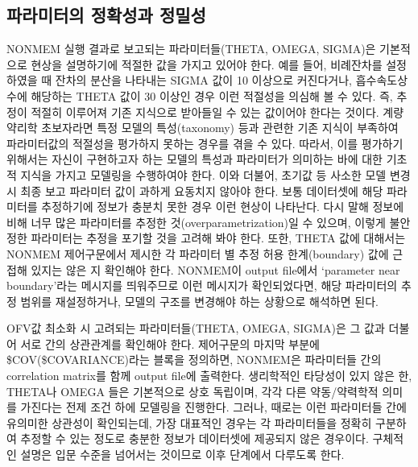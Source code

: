 \documentclass[
  11pt,
  krantz2, a4paper, twoside]{krantz}
\theoremstyle{definition}
\theoremstyle{definition}
\theoremstyle{definition}
\theoremstyle{remark}
\begin{document}
\hypertarget{uxd30cuxb77cuxbbf8uxd130uxc758-uxc815uxd655uxc131uxacfc-uxc815uxbc00uxc131}{%
\subsection{파라미터의 정확성과 정밀성}\label{uxd30cuxb77cuxbbf8uxd130uxc758-uxc815uxd655uxc131uxacfc-uxc815uxbc00uxc131}}

NONMEM 실행 결과로 보고되는 파라미터들(THETA, OMEGA, SIGMA)은 기본적으로 현상을 설명하기에 적절한 값을 가지고 있어야 한다. 예를 들어, 비례잔차를 설정하였을 때 잔차의 분산을 나타내는 SIGMA 값이 10 이상으로 커진다거나, 흡수속도상수에 해당하는 THETA 값이 30 이상인 경우 이런 적절성을 의심해 볼 수 있다. 즉, 추정이 적절히 이루어져 기존 지식으로 받아들일 수 있는 값이어야 한다는 것이다. 계량약리학 초보자라면 특정 모델의 특성(taxonomy) 등과 관련한 기존 지식이 부족하여 파라미터값의 적절성을 평가하지 못하는 경우를 겪을 수 있다. 따라서, 이를 평가하기 위해서는 자신이 구현하고자 하는 모델의 특성과 파라미터가 의미하는 바에 대한 기초적 지식을 가지고 모델링을 수행하여야 한다. 이와 더불어, 초기값 등 사소한 모델 변경 시 최종 보고 파라미터 값이 과하게 요동치지 않아야 한다. 보통 데이터셋에 해당 파라미터를 추정하기에 정보가 충분치 못한 경우 이런 현상이 나타난다. 다시 말해 정보에 비해 너무 많은 파라미터를 추정한 것(overparametrization)일 수 있으며, 이렇게 불안정한 파라미터는 추정을 포기할 것을 고려해 봐야 한다. 또한, THETA 값에 대해서는 NONMEM 제어구문에서 제시한 각 파라미터 별 추정 허용 한계(boundary) 값에 근접해 있지는 않은 지 확인해야 한다. NONMEM이 output file에서 `parameter near boundary'라는 메시지를 띄워주므로 이런 메시지가 확인되었다면, 해당 파라미터의 추정 범위를 재설정하거나, 모델의 구조를 변경해야 하는 상황으로 해석하면 된다.

OFV값 최소화 시 고려되는 파라미터들(THETA, OMEGA, SIGMA)은 그 값과 더불어 서로 간의 상관관계를 확인해야 한다. 제어구문의 마지막 부분에 \$COV(\$COVARIANCE)라는 블록을 정의하면, NONMEM은 파라미터들 간의 correlation matrix를 함께 output file에 출력한다. 생리학적인 타당성이 있지 않은 한, THETA나 OMEGA 들은 기본적으로 상호 독립이며, 각각 다른 약동/약력학적 의미를 가진다는 전제 조건 하에 모델링을 진행한다. 그러나, 때로는 이런 파라미터들 간에 유의미한 상관성이 확인되는데, 가장 대표적인 경우는 각 파라미터들을 정확히 구분하여 추정할 수 있는 정도로 충분한 정보가 데이터셋에 제공되지 않은 경우이다. 구체적인 설명은 입문 수준을 넘어서는 것이므로 이후 단계에서 다루도록 한다.
\end{document}

